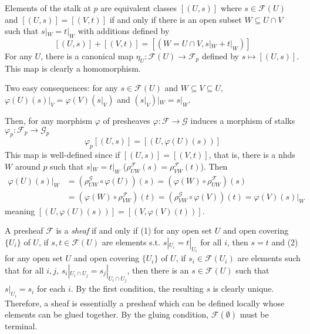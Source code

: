 \documentclass[12pt,letter]{article}
\begin{document}
    Elements of the stalk at $p$ are equivalent classes $[(U, s)]$ where $s\in\mathscr F(U)$ and $[(U, s)]=[(V, t)]$ if and only if there is an open subset $W\subseteq U\cap V$ such that $s|_W=t|_W$ with additions defined by 
    \[[(U, s)]+[(V, t)]=[(W=U\cap V,s|_W+t|_W)]\] 
    For any $U$, there is a canonical map $\eta_U:\mathscr F(U)\to \mathscr F_p$ defined by $s\mapsto [(U, s)]$. This map is clearly a homomorphism.
    
    Two easy consequences: for any $s\in\mathscr F(U)$ and $W\subseteq V\subseteq U$, $\varphi(U)(s)|_V=\varphi(V)(s|_V)$ and $\left(s|_V\right)|_W=s|_W$.
    
    Then, for any morphism $\varphi$ of presheaves $\varphi: \mathscr F\to\mathscr G$ induces a morphism of stalks $\varphi_p:\mathscr F_p\to\mathscr G_p$
    \[\varphi_p[(U, s)]=[(U, \varphi(U)(s))]\]
    This map is well-defined since if $[(U, s)]=[(V, t)]$, that is, there is a nhds $W$ around $p$ such that $s|_W = t|_W$ ($\rho^{\mathscr F}_{UW}(s)=\rho^{\mathscr F}_{VW}(t)$). Then
    \begin{align*}
    \varphi(U)(s)|_W&=(\rho^\mathscr{G}_{UW}\circ \varphi(U))(s)=(\varphi(W) \circ \rho^{\mathscr F}_{UW})(s)\\
    &=(\varphi(W) \circ \rho^{\mathscr F}_{VW})(t) = (\rho^\mathscr{G}_{VW} \circ \varphi (V))(t)=\varphi(V)(s)|_W
    \end{align*}
    meaning $[(U, \varphi(U)(s))]=[(V, \varphi(V)(t))]$.
    
    A presheaf $\mathscr F$ is a \textit{sheaf} if and only if (1) for any open set $U$ and open covering $\{U_i\}$ of $U$, if $s, t\in\mathscr F(U)$ are elements s.t. $s|_{U_i}=t|_{U_i}$ for all $i$, then $s=t$ and (2) for any open set $U$ and open covering $\{U_i\}$ of $U$, if $s_i\in\mathscr F(U_i)$ are elements such that for all $i, j$, $s_i|_{U_i\cap U_j}=s_j|_{U_i\cap U_j}$, then there is an $s\in\mathscr F(U)$ such that $s|_{U_i}=s_i$ for each $i$. By the first condition, the resulting $s$ is clearly unique. Therefore, a sheaf is essentially a presheaf which can be defined locally whose elements can be glued together. By the gluing condition, $\mathscr F(\emptyset)$ must be terminal.
\end{document}
